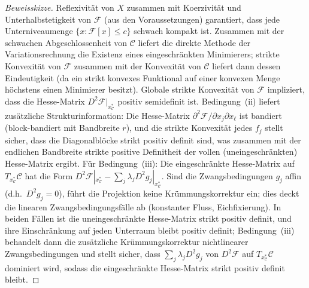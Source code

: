 \documentclass[12pt,a4paper]{article}
\theoremstyle{definition}
\theoremstyle{remark}
\begin{document}
\begin{proof}[Beweisskizze]
Reflexivität von $X$ zusammen mit Koerzivität und Unterhalbstetigkeit von $\mathcal{F}$ (aus den Voraussetzungen) garantiert,
dass jede Unterniveaumenge $\{x : \mathcal{F}[x] \le c\}$ schwach kompakt ist.
Zusammen mit der schwachen Abgeschlossenheit von $\mathcal{C}$ liefert die direkte Methode der
Variationsrechnung die Existenz eines eingeschränkten Minimierers;
strikte Konvexität von $\mathcal{F}$ zusammen mit der Konvexität von $\mathcal{C}$ liefert dann dessen Eindeutigkeit (da ein strikt konvexes Funktional auf einer konvexen Menge höchstens einen Minimierer besitzt).
Globale strikte Konvexität von $\mathcal{F}$ impliziert,
dass die Hesse-Matrix $D^2\mathcal{F}|_{x^*_{\mathcal{C}}}$ positiv semidefinit ist.
Bedingung~(ii) liefert zusätzliche Strukturinformation: Die Hesse-Matrix
$\partial^2 \mathcal{F}/\partial x_j \partial x_\ell$ ist bandiert
(block-bandiert mit Bandbreite $r$), und die strikte Konvexität jedes $f_j$
stellt sicher, dass die Diagonalblöcke strikt positiv definit sind, was
zusammen mit der endlichen Bandbreite strikte positive Definitheit der
vollen (uneingeschränkten) Hesse-Matrix ergibt.
Für Bedingung~(iii): Die eingeschränkte Hesse-Matrix auf $T_{x^*_{\mathcal{C}}}\mathcal{C}$
hat die Form $D^2\mathcal{F}|_{x^*_{\mathcal{C}}} - \sum_j \lambda_j D^2 g_j|_{x^*_{\mathcal{C}}}$.
Sind die Zwangsbedingungen $g_j$ affin (d.h.\ $D^2 g_j = 0$), führt die
Projektion keine Krümmungskorrektur ein; dies deckt die linearen
Zwangsbedingungsfälle ab (konstanter Fluss, Eichfixierung).
In beiden Fällen ist die uneingeschränkte Hesse-Matrix strikt positiv definit, und ihre Einschränkung auf jeden Unterraum bleibt positiv definit; Bedingung~(iii) behandelt dann die zusätzliche Krümmungskorrektur nichtlinearer Zwangsbedingungen und stellt sicher, dass $\sum_j \lambda_j D^2 g_j$ von $D^2\mathcal{F}$ auf $T_{x^*_{\mathcal{C}}}\mathcal{C}$ dominiert wird, sodass die eingeschränkte Hesse-Matrix strikt positiv definit bleibt.
\end{proof}
\end{document}

